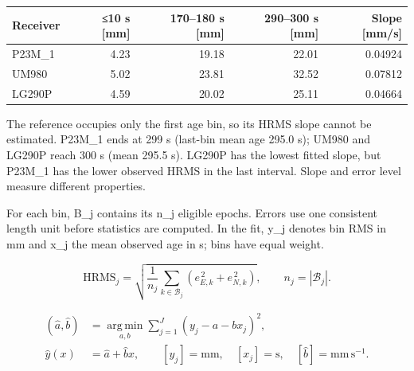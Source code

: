 \documentclass[11pt,a4paper]{article}
\numberwithin{equation}{section}
\numberwithin{figure}{section}
\begin{document}
\begin{center}\begin{lrbox}{\reporttable}\small\setlength{\tabcolsep}{4pt}\begin{tabular}{lrrrr}\toprule
Receiver & ≤10 s [mm] & 170–180 s [mm] & 290–300 s [mm] & Slope [mm/\allowbreak{}s]\\\midrule
P23M\_1 & 4.23 & 19.18 & 22.01 & 0.04924\\
UM980 & 5.02 & 23.81 & 32.52 & 0.07812\\
LG290P & 4.59 & 20.02 & 25.11 & 0.04664\\
\bottomrule\end{tabular}\end{lrbox}\ifdim\wd\reporttable>\linewidth\resizebox{\linewidth}{!}{\usebox{\reporttable}}\else\usebox{\reporttable}\fi\end{center}

The reference occupies only the first age bin, so its HRMS slope cannot be estimated. P23M\_1 ends at 299 s (last-bin mean age 295.0 s); UM980 and LG290P reach 300 s (mean 295.5 s). LG290P has the lowest fitted slope, but P23M\_1 has the lower observed HRMS in the last interval. Slope and error level measure different properties.

For each bin, B\_j contains its n\_j eligible epochs. Errors use one consistent length unit before statistics are computed. In the fit, y\_j denotes bin RMS in mm and x\_j the mean observed age in s; bins have equal weight.

\begin{equation}\mathrm{HRMS}_j=\sqrt{\frac{1}{n_j}\sum_{k\in\mathcal B_j}\left(e_{E,k}^{\,2}+e_{N,k}^{\,2}\right)},\qquad n_j=|\mathcal B_j|.\label{eq:en-hrms}\end{equation}

\begin{equation}\begin{aligned}(\hat a,\hat b)&=\underset{a,b}{\operatorname{arg\,min}}\sum_{j=1}^{J}(y_j-a-bx_j)^2,\\ \hat y(x)&=\hat a+\hat b x,\qquad [y_j]=\mathrm{mm},\quad [x_j]=\mathrm{s},\quad [\hat b]=\mathrm{mm\,s^{-1}}.\end{aligned}\label{eq:en-fit}\end{equation}
\end{document}
